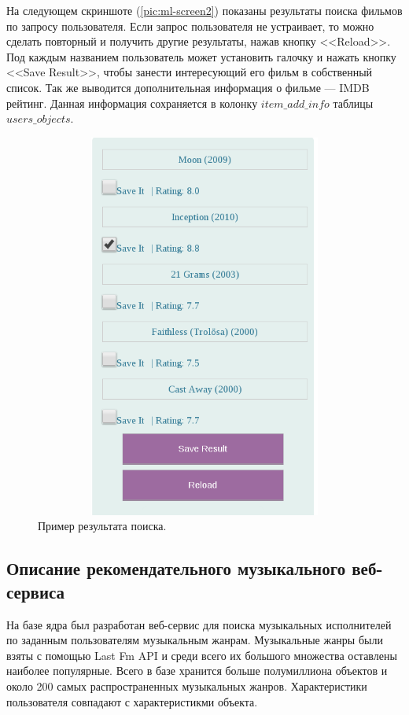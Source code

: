 На следующем скриншоте (\ref{pic:ml-screen2}) показаны результаты поиска фильмов по запросу пользователя. Если запрос пользователя не устраивает, то
можно сделать повторный и получить другие результаты, нажав кнопку <<Reload>>. Под каждым названием пользователь может
установить галочку и нажать кнопку <<Save Result>>, чтобы занести интересующий его фильм в собственный список.
Так же выводится дополнительная информация о фильме --- IMDB рейтинг. Данная информация сохраняется в колонку  $item\_add\_info$
таблицы $users\_objects$.
\begin{figure}
	\label{pic:ml-screen1}
\caption{Пример результата поиска.}
\begin{center}
  \includegraphics[width=5in,height=5in]{pics/ml-rslt.png}
\end{center}
\end{figure}

\subsection{Описание рекомендательного музыкального веб-сервиса}
На базе ядра был разработан веб-сервис для поиска музыкальных исполнителей
по заданным пользователям музыкальным жанрам. Музыкальные жанры были
взяты с помощью Last Fm API и среди всего их большого множества оставлены
наиболее
популярные. Всего в базе хранится больше полумиллиона объектов и около 200
самых
распространенных музыкальных жанров. Характеристики пользователя совпадают с
характеристикми объекта.

